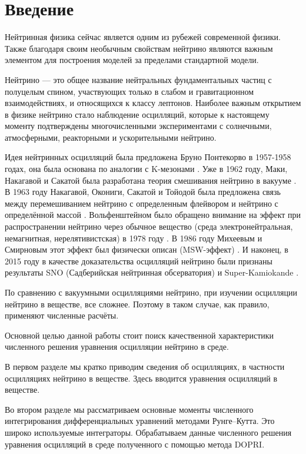 \documentclass[a4paper,12pt]{article}
\begin{document}
\setcounter{page}{2}

\thispagestyle{empty}
\tableofcontents

\newpage

	\section*{Введение}
Нейтринная физика сейчас является одним из рубежей современной физики. Также благодаря своим необычным свойствам нейтрино являются важным элементом для построения моделей за пределами стандартной модели.

Нейтрино --- это общее название нейтральных фундаментальных частиц с полуцелым спином, участвующих только в слабом и гравитационном взаимодействиях, и относящихся к классу лептонов. Наиболее важным открытием в физике нейтрино стало наблюдение осцилляций, которые к настоящему моменту подтверждены многочисленными экспериментами с солнечными, атмосферными, реакторными и ускорительными нейтрино.

Идея нейтринных осцилляций была предложена Бруно Понтекорво в 1957-1958 годах, она была основана по аналогии с K-мезонами \cite{11, 22}. Уже в 1962 году, Маки, Накагавой и Сакатой была разработана теория смешивания нейтрино в вакууме \cite{33}. В 1963 году Накагавой, Окониги, Сакатой и Тойодой была предложена связь между перемешиванием нейтрино с определенным флейвором и нейтрино с определённой массой \cite{44}. Вольфенштейном было обращено внимание на эффект при распространении нейтрино через обычное вещество (среда электронейтральная, немагнитная, нерелятивистская) в 1978 году \cite{55, 66}. В 1986 году Михеевым и Смирновым этот эффект был физически описан (MSW-эффект) \cite{77, 88}. И наконец, в 2015 году в качестве доказательства осцилляций нейтрино были признаны результаты SNO (Садберийская нейтринная обсерватория) \cite{99} и Super-Kamiokande \cite{1010}.

По сравнению с вакуумными осцилляциями нейтрино, при изучении осцилляции нейтрино в веществе, все сложнее. Поэтому в таком случае, как правило, применяют численные расчёты.

Основной целью данной работы стоит поиск качественной характеристики численного решения уравнения осцилляции нейтрино в среде.

В первом разделе мы кратко приводим сведения об осцилляциях, в частности осцилляциях нейтрино в веществе. Здесь вводится уравнения осцилляций в веществе.

Во втором разделе мы рассматриваем основные моменты численного интегрирования дифференциальных уравнений методами Рунге--Кутта. Это широко используемые интеграторы. Обрабатываем данные численного решения уравнения осцилляций в среде полученного с помощью метода DOPRI.
\end{document}
